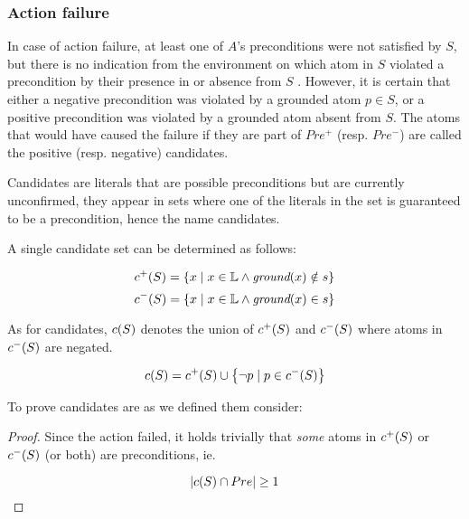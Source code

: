 \documentclass[\master/Master.tex]{subfiles}
\begin{document}
\subsubsection*{Action failure}
In case of action failure, at least one of $A$'s preconditions were not satisfied by $S$, but there is no indication from the environment on which atom in $S$ violated a precondition by their presence in or absence from $S$ . However, it is certain that either a negative precondition was violated by a grounded atom $p \in S$, or a positive precondition was violated by a grounded atom absent from $S$. The atoms that would have caused the failure if they are part of $Pre^+$ (resp. $Pre^-$) are called the positive (resp. negative) candidates.
\begin{definition}[Candidates]
	Candidates are literals that are possible preconditions but are currently unconfirmed, they appear in sets where one of the literals in the set is guaranteed to be a precondition, hence the name candidates.
\end{definition}

 A single candidate set can be determined as follows:

\begin{equation} \label{eq:cPlus}
    c^+(S) = \left\{ x \; | \; x \in \mathbb{L} \land \textit{ground}(x) \notin s \right\}
\end{equation}
\begin{equation} \label{eq:cMinus}
    c^-(S) = \left\{ x \; | \; x \in \mathbb{L} \land \textit{ground}(x) \in s \right\}
\end{equation}

As for candidates, $c(S)$ denotes the union of $c^+(S)$ and $c^-(S)$ where atoms in $c^-(S)$ are negated.

\begin{equation}
    c(S) = c^+(S) \cup \left\{ \neg p \; | \; p \in c^-(S) \right\}
\end{equation}

To prove candidates are as we defined them consider: 
\begin{proof}
	Since the action failed, it holds trivially that \textit{some} atoms in $c^+(S)$ or $c^-(S)$ (or both) are preconditions, ie.
	
	\begin{equation} \label{eq:inv}
	\left| c(S) \cap Pre \right| \geq 1
	\end{equation}
\end{proof}
\end{document}
